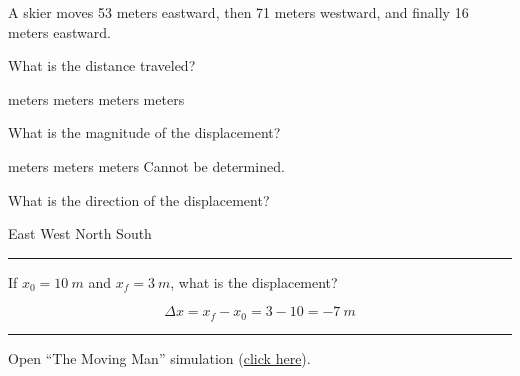 \documentclass[]{exam}
\begin{document}
\begin{questions}
\begin{questions}
\begin{EnvUplevel}
A skier moves 53 meters eastward, then 71 meters westward, and finally 16 meters eastward. 
\end{EnvUplevel}


\question \label{ques:Skier_start}
What is the distance traveled?

\begin{choices}
 meters
 meters
 meters
 meters
\end{choices}

\question
What is the magnitude of the displacement?

\begin{choices}
 meters
 meters
 meters
\choice Cannot be determined.
\end{choices}

\question \label{ques:Skier_end}
What is the direction of the displacement?

\begin{choices}
\choice East
\CorrectChoice West
\choice North   
\choice South
\end{choices}

\vspace{1em} \hrule

\question
If $x_0 = \SI{10}{m}$ and $x_f = \SI{3}{m}$, what is the displacement?

\begin{solution}
\begin{equation*}
    \Delta{x} = x_f - x_0 = 3 - 10 = \SI{-7}{m} 
\end{equation*}
\end{solution}


\vspace{1em}
\hrule

\question
Open ``The Moving Man'' simulation (\href{https://archive.cnx.org/specials/e2ca52af-8c6b-450e-ac2f-9300b38e8739/moving-man/}{click here}). 

\end{questions}
\end{questions}
\end{document}

